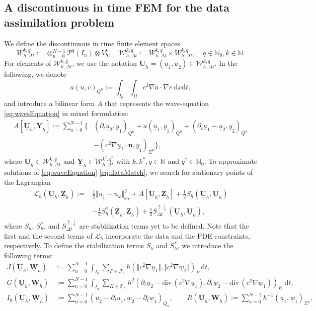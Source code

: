 \documentclass[sn-mathphys-num]{sn-jnl}
\numberwithin{equation}{section}
\newcommand{\jump}[1]{\llbracket#1\rrbracket}
\newcommand{\cL}{\mathcal{L}}
\renewcommand{\div}{\mathrm{div}\,}  %
\newcommand{\dT}{\mathrm{d}t}
\newcommand{\dX}{\mathrm{d}x}
\newcommand{\FullyDiscrSpace}[2]{ W^{ {#1},{#2}}_{h, \Delta t  } }
\newcommand{\ProdFullyDiscrSpace}[2]{ \mathcal{W}^{ {#1},{#2}}_{h, \Delta t  } }
\newcommand{\Uh}{\underline{\mathbf{U}}_h}
\newcommand{\Yh}{\underline{\mathbf{Y}}_h}
\newcommand{\Zh}{\underline{\mathbf{Z}}_h}
\newcommand{\Wh}{\underline{\mathbf{W}}_h}
\newcommand{\ul}{\underline{u}}
\newcommand{\yl}{\underline{y}}
\newcommand{\wl}{\underline{w}}
\newcommand{\Sud}{S^{\uparrow \downarrow}_{\Delta t}}
\newcommand{\dt}{\partial_t}
\begin{document}
\subsection{A discontinuous in time FEM for the data assimilation problem}\label{sec:method}
\noindent We define the discontinuous in time finite element spaces 
\begin{equation}
    \FullyDiscrSpace{k}{q} := \otimes_{n = 0}^{N-1} \mathcal{P}^q(I_n) \otimes V_h^k, \quad \ProdFullyDiscrSpace{k}{q} :=  \FullyDiscrSpace{k}{q} \times \FullyDiscrSpace{k}{q}, \quad q \in \mathbb{N}_0, k \in \mathbb{N}. 
\end{equation}
For elements of $\ProdFullyDiscrSpace{k}{q}$, we use the notation $\Uh = (\ul_1,\ul_2) \in \ProdFullyDiscrSpace{k}{q}$. In the following, we denote
\begin{equation*}
    a(u,v)_{Q^n} := \int_{I_n} \int_{\Omega} c^2 \nabla u \cdot \nabla v \ \dX \dT,
\end{equation*}
and introduce a bilinear form $A$ that represents the wave-equation \eqref{eq:waveEquation} in mixed formulation:  
\begin{equation}
    \begin{aligned}
        A[\Uh,\Yh] := \sum_{n = 0}^{N -1} \Big\{ &(\dt \ul_2, \yl_1)_{Q^n} + a(\ul_1,\yl_1)_{Q^n} + (\dt \ul_1 - \ul_2,\yl_2)_{Q^n} \\
        &- (c^2 \nabla \ul_1 \cdot \mathbf{n}, \yl_1)_{\Sigma^n} \Big\},
    \end{aligned}
\end{equation} 
where $\Uh \in \ProdFullyDiscrSpace{k}{q}$ and $\Yh \in \ProdFullyDiscrSpace{k^\ast}{q^\ast}$ with $k, k^\ast, q \in \mathbb{N}$ and $q^\ast \in \mathbb{N}_0$. 
To approximate solutions of \eqref{eq:waveEquation}-\eqref{eq:dataMatch}, we search for stationary points of the Lagrangian 
\begin{align*}
    \cL_h (\Uh, \Zh) := &\frac{1}{2} \Vert \ul_1 - u_{\omega} \Vert^2_{\omega_T} + A[\Uh,\Zh] + \frac{1}{2}  S_h(\Uh,\Uh) \\
    &- \frac{1}{2}  S_h^\ast(\Zh,\Zh) + \frac{1}{2} \Sud(\Uh,\Uh),
\end{align*}
where $S_h$, $S_h^\ast$, and $\Sud$ are stabilization terms yet to be defined. Note that the first and the second terms of $\cL_h$ incorporate the data and the PDE constraints, respectively. To define the stabilization terms $S_h$ and $S_h^\ast$, we introduce the following terms: 
\begin{align*}
    J(\Uh,\Wh) &:= \sum_{n = 0}^{N -1} \int_{I_n} \sum_{F \in \mathcal{F}_i} h (\jump{c^2 \nabla \ul_1}, \jump{c^2 \nabla \wl_1})_F \ \dT, \\
    G(\Uh,\Wh) &:= \sum_{n = 0}^{N -1} \int_{I_n} \sum_{K \in \mathcal{T}_h} h^2 (\dt \ul_2 - \div (c^2 \nabla \ul_1),\dt \wl_2 -\div( c^2 \nabla \wl_1))_K \ \dT, \\
    I_0(\Uh,\Wh) &:= \sum_{n = 0}^{N -1} (\ul_2 - \dt \ul_1, \wl_2-\dt \wl_1)_{Q_n}, \qquad 
    R(\Uh,\Wh) := \sum_{n = 0}^{N -1} h^{-1} (\ul_1,\wl_1)_{\Sigma^n}. 
\end{align*}
\end{document}
